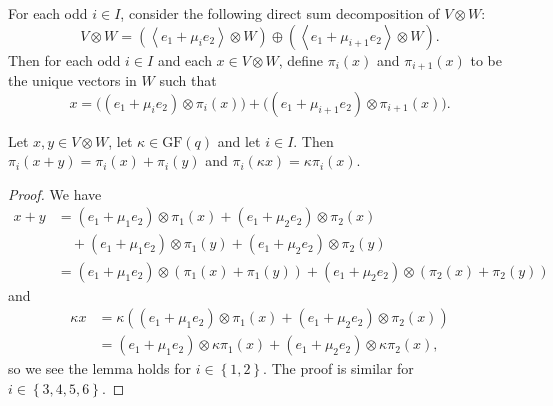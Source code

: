 \documentclass[ALCO, Unicode]{cedram}
\newcommand{\GF}{\mathrm{GF}}
\begin{document}
\begin{defi} \label{def:projection-coordinates}
For each odd $i \in I$, consider the following direct sum decomposition of $V \otimes W$:
\begin{displaymath}
    V \otimes W = \left(\left<e_1 + \mu_i e_2 \right> \otimes W \right) \oplus {\left(\left<e_1 + \mu_{i+1} e_2 \right> \otimes W \right)}.
\end{displaymath}
Then for each odd $i \in I$ and each $x \in V \otimes W$, define $\pi_i{\left(x \right)}$ and $\pi_{i+1}{\left(x \right)}$ to be the unique vectors in $W$ such that
\begin{displaymath}
    x = \Big({\left(e_1 + \mu_i e_2 \right)} \otimes \pi_i{\left(x \right)} \Big) + \Big({\left(e_1 + \mu_{i+1} e_2 \right)} \otimes \pi_{i+1}{\left(x \right)}\Big).
\end{displaymath}
\end{defi}

\begin{lemma} \label{lm:projections-preserve-addition-and-multiplication}
Let $x, y \in V \otimes W$, let $\kappa \in \GF{\left(q \right)}$ and let $i \in I$. Then $\pi_i{\left(x + y \right)} = \pi_i{\left(x \right)} + \pi_i{\left(y \right)}$ and $\pi_i{\left(\kappa x \right)} = \kappa \pi_i{\left(x \right)}$.
\end{lemma}
\begin{proof}
We have
\begin{align*}
    x + y &= \left(e_1 + \mu_1 e_2 \right) \otimes \pi_1{\left(x \right)} + \left(e_1 + \mu_2 e_2 \right) \otimes \pi_2{\left(x \right)} \\
    & \quad + \left(e_1 + \mu_1 e_2 \right) \otimes \pi_1{\left(y \right)} + \left(e_1 + \mu_2 e_2 \right) \otimes \pi_2{\left(y \right)} \\
    &= \left(e_1 + \mu_1 e_2 \right) \otimes \left(\pi_1{\left(x \right)} + \pi_1{\left(y \right)}\right) + \left(e_1 + \mu_2 e_2 \right) \otimes \left(\pi_2{\left(x \right)} + \pi_2{\left(y \right)}\right)
\end{align*}
and
\begin{align*}
    \kappa x &= \kappa \left(\left(e_1 + \mu_1 e_2 \right) \otimes \pi_1{\left(x \right)} + \left(e_1 + \mu_2 e_2 \right) \otimes \pi_2{\left(x \right)}\right) \\
    &= \left(e_1 + \mu_1 e_2 \right) \otimes \kappa \pi_1{\left(x \right)} + \left(e_1 + \mu_2 e_2 \right) \otimes \kappa \pi_2{\left(x \right)},
\end{align*}
so we see the lemma holds for $i \in \left\{1, 2 \right\}$. The proof is similar for $i \in \left\{3, 4, 5, 6 \right\}$.
\end{proof}
\end{document}
